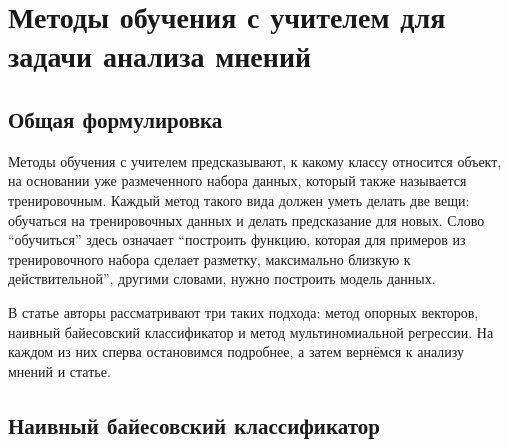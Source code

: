 \section{Методы обучения с учителем для задачи анализа мнений}

\subsection{Общая формулировка}
Методы обучения с учителем предсказывают, к какому классу относится объект, на основании уже
размеченного набора данных, который также называется тренировочным. Каждый метод такого вида должен
уметь делать две вещи: обучаться на тренировочных данных и делать предсказание для новых. Слово
``обучиться'' здесь означает ``построить функцию, которая для примеров из тренировочного набора
сделает разметку, максимально близкую к действительной'', другими словами, нужно построить модель
данных.

В статье \cite{pang2002thumbs} авторы рассматривают три таких подхода: метод опорных
векторов, наивный байесовский классификатор и метод мультиномиальной регрессии. На каждом из них
сперва остановимся подробнее, а затем вернёмся к анализу мнений и статье.

\subsection{Наивный байесовский классификатор}
